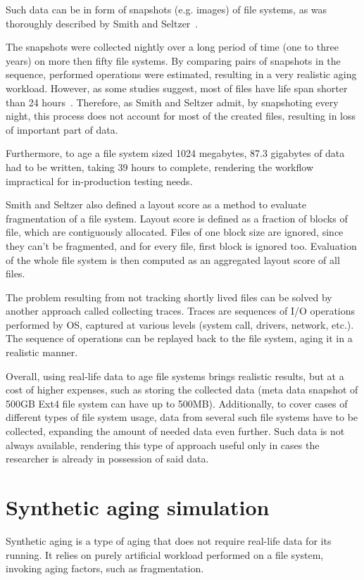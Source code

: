 \documentclass[
  color, %
  table, %
  lof,   %
  lot,   %
]{fithesis3}
\begin{document}
Such data can be in form of snapshots (e.g. images) of file systems, as was thoroughly described by Smith and Seltzer~\cite{Smith:1997:FSA:258623.258689}.

The snapshots were collected nightly over a long period of time (one to three years) on more then fifty file systems. By comparing pairs of snapshots in the sequence, performed operations were estimated, resulting in a very realistic aging workload. However, as some studies suggest, most of files have life span shorter than 24 hours~\cite{Ousterhout:1985:TAU:323647.323631}. Therefore, as Smith and Seltzer admit, by snapshoting every night, this process does not account for most of the created files, resulting in loss of important part of data.

Furthermore, to age a file system sized 1024 megabytes, 87.3 gigabytes of data had to be written, taking 39 hours to complete, rendering the workflow impractical for in-production testing needs.

Smith and Seltzer also defined a layout score as a method to evaluate fragmentation of a file system. Layout score is defined as a fraction of blocks of file, which are contiguously allocated. Files of one block size are ignored, since they can't be fragmented, and for every file, first block is ignored too. Evaluation of the whole file system is then computed as an aggregated layout score of all files.

The problem resulting from not tracking shortly lived files can be solved by another approach called collecting traces. Traces are sequences of I/O operations performed by OS, captured at various levels (system call, drivers, network, etc.). The sequence of operations can be replayed back to the file system, aging it in a realistic manner.

Overall, using real-life data to age file systems brings realistic results, but at a cost of higher expenses, such as storing the collected data (meta data snapshot of 500GB Ext4 file system can have up to 500MB). Additionally, to cover cases of different types of file system usage, data from several such file systems have to be collected, expanding the amount of needed data even further. Such data is not always available, rendering this type of approach useful only in cases the researcher is already in possession of said data.
\section{Synthetic aging simulation}
Synthetic aging is a type of aging that does not require real-life data for its running. It relies on purely artificial workload performed on a file system, invoking aging factors, such as fragmentation.
\end{document}
